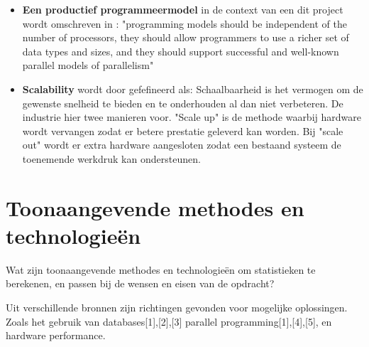 \begin{itemize}
    \item \textbf{Een productief programmeermodel} in de context van een dit project wordt omschreven in \cite{asanovic2006landscape}: "programming models should be independent of the number of processors, they should allow programmers to use a richer set of data types and sizes, and they should support successful and well-known parallel models of parallelism"

    \item \textbf{Scalability} wordt door \cite{dubey2005recognition} gefefineerd als: Schaalbaarheid is het vermogen om de gewenste snelheid te bieden en te onderhouden al dan niet verbeteren. De industrie hier twee manieren voor. "Scale up" is de methode waarbij hardware wordt vervangen zodat er betere prestatie geleverd kan worden. Bij "scale out" wordt er extra hardware aangesloten zodat een bestaand systeem de toenemende werkdruk kan ondersteunen.
\end{itemize}

\begin{comment}
De grootte van alle databronnen voor een webwinkel per dag ligt tussen de 0.5 MB en 130 MB per dag. Om de data grootte in te schatten met 10.000 webwinkels kan huidige datagrootte van een gemiddelde dag worden ge-extrapoleert. Er moet rekeningen worden gehouden met het Paretoprincipe, dat zou verklaren dat 20\% van de webwinkels verantwoordelijk is voor 80\% van de datagrootte. Dit is ook waar te namen in het analyseren van de datasets. %

\end{comment}


\clearpage

\section{Toonaangevende methodes en technologieën}
\label{sec:deelvraag2}

Wat zijn toonaangevende methodes en technologieën om statistieken te berekenen, en passen bij de wensen en eisen van de opdracht?

Uit verschillende bronnen zijn richtingen gevonden voor mogelijke oplossingen. Zoals het gebruik van databases[1],[2],[3] parallel programming[1],[4],[5], en hardware performance.


